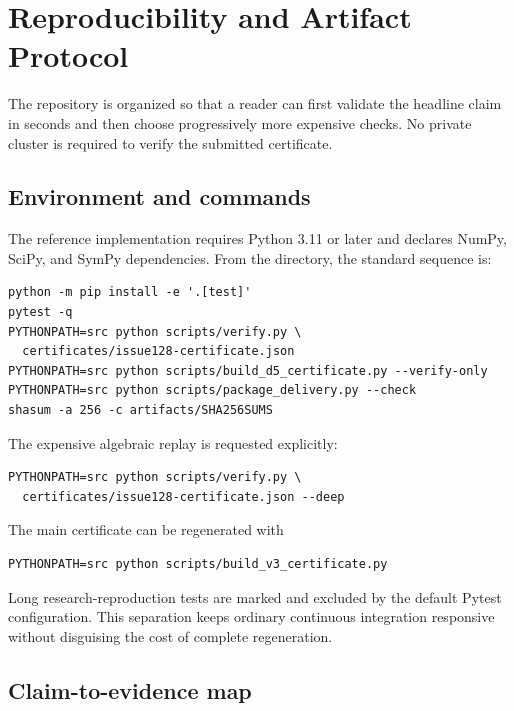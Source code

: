 \section{Reproducibility and Artifact Protocol}
\label{sec:reproducibility}

The repository is organized so that a reader can first validate the headline
claim in seconds and then choose progressively more expensive checks.  No
private cluster is required to verify the submitted certificate.

\subsection{Environment and commands}

The reference implementation requires Python 3.11 or later and declares
NumPy, SciPy, and SymPy dependencies.  From the  directory, the
standard sequence is:
\begin{verbatim}
python -m pip install -e '.[test]'
pytest -q
PYTHONPATH=src python scripts/verify.py \
  certificates/issue128-certificate.json
PYTHONPATH=src python scripts/build_d5_certificate.py --verify-only
PYTHONPATH=src python scripts/package_delivery.py --check
shasum -a 256 -c artifacts/SHA256SUMS
\end{verbatim}
The expensive algebraic replay is requested explicitly:
\begin{verbatim}
PYTHONPATH=src python scripts/verify.py \
  certificates/issue128-certificate.json --deep
\end{verbatim}
The main certificate can be regenerated with
\begin{verbatim}
PYTHONPATH=src python scripts/build_v3_certificate.py
\end{verbatim}
Long research-reproduction tests are marked  and excluded by the
default Pytest configuration.  This separation keeps ordinary continuous
integration responsive without disguising the cost of complete regeneration.

\subsection{Claim-to-evidence map}

